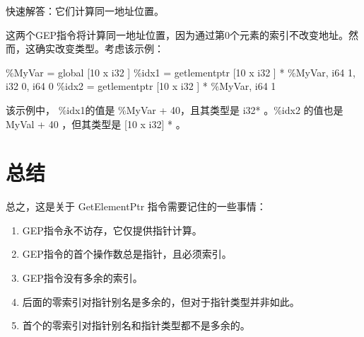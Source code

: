 \documentclass[12pt,a4paper]{article}
\begin{document}
快速解答：它们计算同一地址位置。

这两个GEP指令将计算同一地址位置，因为通过第0个元素的索引不改变地址。然而，这确实改变类型。考虑该示例：


\%MyVar = global { [10 x i32 ] }
\%idx1 = getlementptr { [10 x i32 ] }* \%MyVar, i64 1, i32 0, i64 0
\%idx2 = getlementptr { [10 x i32 ] }* \%MyVar, i64 1

该示例中， \%idx1的值是 \%MyVar + 40，且其类型是 i32* 。\%idx2 的值也是 MyVal + 40 ，但其类型是 { [10 x i32] }* 。

\section{总结}

总之，这是关于 GetElementPtr 指令需要记住的一些事情：

\begin{enumerate}
\item GEP指令永不访存，它仅提供指针计算。
\item GEP指令的首个操作数总是指针，且必须索引。
\item GEP指令没有多余的索引。
\item 后面的零索引对指针别名是多余的，但对于指针类型并非如此。
\item 首个的零索引对指针别名和指针类型都不是多余的。
\end{enumerate}
\end{document}
